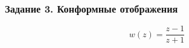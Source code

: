 \begin{frame}\frametitle{Задание 3. Конформные отображения}
\[ w(z) = \frac{z-1}{z+1} \]

\end{frame}
